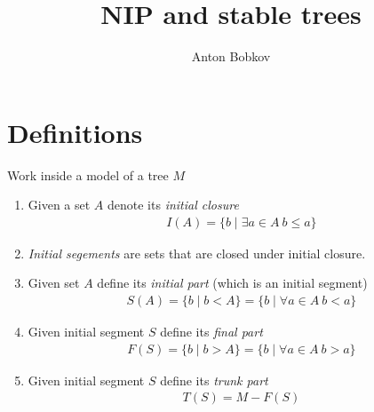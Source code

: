 \documentclass{amsart}
\begin{document}
\title{NIP and stable trees}
\author{Anton Bobkov}

\maketitle

\section{Definitions}

\begin{Definition}Work inside a model of a tree $M$
	\begin{enumerate}
		\item Given a set $A$ denote its \emph{initial closure} 
		\begin{align*}
			I(A) = \{b \mid \exists a \in A \ b \leq a\}
		\end{align*}
		\item \emph{Initial segements} are sets that are closed under initial closure.
		\item Given set $A$ define its \emph{initial part} (which is an initial segment)
		\begin{align*}
			S(A) = \{b \mid b < A\} = \{b \mid \forall a \in A \ b < a\}
		\end{align*}
		\item Given initial segment $S$ define its \emph{final part}
		\begin{align*}
			F(S) = \{b \mid b > A\} = \{b \mid \forall a \in A \ b > a\}
		\end{align*}
		\item Given initial segment $S$ define its \emph{trunk part}
		\begin{align*}
			T(S) = M - F(S)
		\end{align*}
	\end{enumerate}
\end{Definition}
\end{document}
